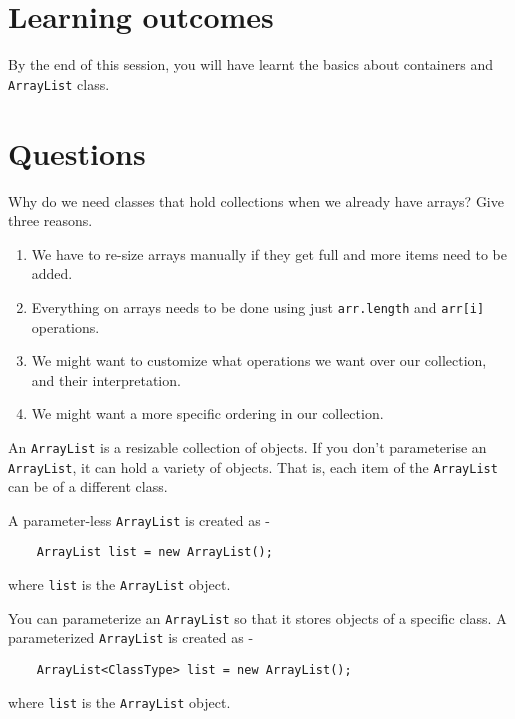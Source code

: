 
\section* {Learning outcomes}

By the end of this session, you will have learnt the basics about containers and \texttt{ArrayList} class. 

\section*{Questions}
\begin{questions}

\question Why do we need classes that hold collections when we already have arrays? Give three reasons.

\ifprintanswers
\begin{enumerate}
\item We have to re-size arrays manually if they get full and more items need to be added.
\item Everything on arrays needs to be done using just \texttt{arr.length} and \texttt{arr[i]} operations.
\item We might want to customize what operations we want over our collection, and their interpretation.
\item We might want a more specific ordering in our collection.
\end{enumerate}
\else
\fi

\question
An \texttt{ArrayList} is a resizable collection of objects. If you don't parameterise an \texttt{ArrayList}, it can hold a variety of objects. That is, each item of the \texttt{ArrayList} can be of a different class.

A parameter-less \texttt{ArrayList} is created as -

\begin{lstlisting}
    ArrayList list = new ArrayList();
\end{lstlisting}
where \texttt{list} is the \texttt{ArrayList} object.

You can parameterize an \texttt{ArrayList} so that it stores objects of a specific class. A parameterized \texttt{ArrayList} is created as -

\begin{lstlisting}
    ArrayList<ClassType> list = new ArrayList();
\end{lstlisting}

where \texttt{list} is the \texttt{ArrayList} object.


\end{questions}
